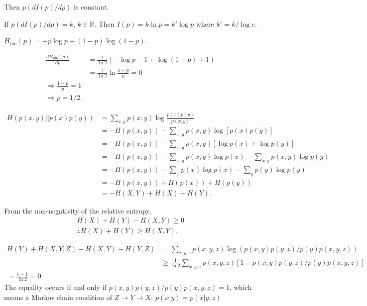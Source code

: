 Then $p (d I(p) / d p)$ is constant.

If $p (d I(p) / d p) = k$, $k \in \mathds{R}$.
Then $I(p) = k \ln p = k' \log p$ where $k' = k / \log e$.



$H_{\text{bin}}(p) = - p\log p - (1-p) \log (1-p)$.

\begin{align}
    \frac{d H_{\text{bin}}(p)}{d p}
        &= \frac{1}{\ln 2} \left( - \log p - 1 + \log (1-p) + 1 \right)\\
        &= \frac{1}{\ln 2} \ln \frac{1-p}{p} = 0\\
    \Rightarrow \frac{1-p}{p} = 1\\
    \Rightarrow p = 1/2.
\end{align}



\begin{align}
    H\left( p(x,y) || p(x)p(y) \right)
        &= \sum_{x,y} p(x,y) \log \frac{p(x) p(y)}{p(x,y)}\\
        &= - H(p(x,y)) - \sum_{x,y} p(x,y) \log \left[ p(x)p(y) \right]\\
        &= - H(p(x,y)) - \sum_{x,y} p(x,y) \left[ \log p(x) + \log p(y) \right]\\
        &= - H(p(x,y)) - \sum_{x,y} p(x,y) \log p(x) - \sum_{x,y} p(x,y) \log p(y)\\
        &= - H(p(x,y)) - \sum_{x} p(x) \log p(x) - \sum_{y} p(y) \log p(y)\\
        &= - H(p(x,y)) + H(p(x)) + H(p(y))\\
        &= - H(X,Y) + H(X) + H(Y).
\end{align}

From the non-negativity of the relative entropy,
\begin{align}
    H(X) +  H(Y) - H(X,Y) \geq 0\\
    \therefore H(X) + H(Y) \geq H(X,Y).
\end{align}



\begin{align}
    H(Y) + H (X, Y, Z) - H(X, Y) - H(Y, Z)  
        &= \sum_{x,y,z} p(x,y,z) \log \left( p(x,y)p(y,z)/p(y)p(x,y,z) \right) \\
        &\geq \frac{1}{\ln{2}} \sum_{x,y,z} p(x,y,z) \left[1-p(x,y)p(y,z)/p(y)p(x,y,z) \right] \\
        = \frac{1-1}{\ln{2}}
        = 0
\end{align}
The equality occurs if and only if $p(x,y)p(y,z)/p(y)p(x,y,z)=1$, which means a Markov chain condition of $Z \rightarrow Y \rightarrow X$; $p(x|y)=p(x|y,z)$ 

